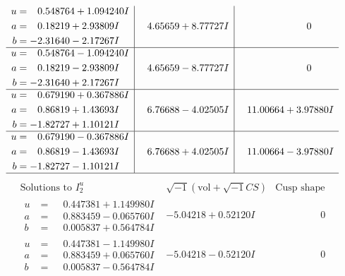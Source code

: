 \documentclass[1p]{elsarticle_modified}
\theoremstyle{definition}
\newcommand{\I}{\sqrt{-1}}
\begin{document}
$$\begin{array}{c|c|c}
\begin{aligned}
u &= \phantom{-}0.548764 + 1.094240 I \\
a &= \phantom{-}0.18219 + 2.93809 I \\
b &= -2.31640 - 2.17267 I\end{aligned}
 & \phantom{-}4.65659 + 8.77727 I & \phantom{-0.000000 } 0 \\ \hline\begin{aligned}
u &= \phantom{-}0.548764 - 1.094240 I \\
a &= \phantom{-}0.18219 - 2.93809 I \\
b &= -2.31640 + 2.17267 I\end{aligned}
 & \phantom{-}4.65659 - 8.77727 I & \phantom{-0.000000 } 0 \\ \hline\begin{aligned}
u &= \phantom{-}0.679190 + 0.367886 I \\
a &= \phantom{-}0.86819 + 1.43693 I \\
b &= -1.82727 + 1.10121 I\end{aligned}
 & \phantom{-}6.76688 - 4.02505 I & \phantom{-}11.00664 + 3.97880 I \\ \hline\begin{aligned}
u &= \phantom{-}0.679190 - 0.367886 I \\
a &= \phantom{-}0.86819 - 1.43693 I \\
b &= -1.82727 - 1.10121 I\end{aligned}
 & \phantom{-}6.76688 + 4.02505 I & \phantom{-}11.00664 - 3.97880 I\\
 \hline 
 \end{array}$$\newpage$$\begin{array}{c|c|c}  
\text{Solutions to }I^u_{2}& \I (\text{vol} + \sqrt{-1}CS) & \text{Cusp shape}\\
 \hline 
\begin{aligned}
u &= \phantom{-}0.447381 + 1.149980 I \\
a &= \phantom{-}0.883459 - 0.065760 I \\
b &= \phantom{-}0.005837 + 0.564784 I\end{aligned}
 & -5.04218 + 0.52120 I & \phantom{-0.000000 } 0 \\ \hline\begin{aligned}
u &= \phantom{-}0.447381 - 1.149980 I \\
a &= \phantom{-}0.883459 + 0.065760 I \\
b &= \phantom{-}0.005837 - 0.564784 I\end{aligned}
 & -5.04218 - 0.52120 I & \phantom{-0.000000 } 0 \\ \hline\begin{aligned}

\end{aligned}
\end{array}$$
\end{document}
